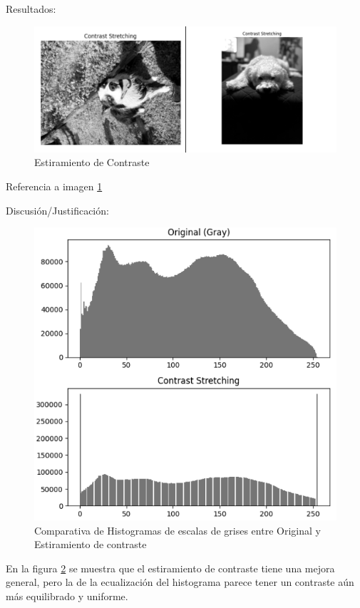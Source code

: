 \documentclass[12pt,letterpaper]{article}
\begin{document}
Resultados:

\begin{figure}[H]
  \centering
  \includegraphics[width=0.8\linewidth]{figuras/estiramiento_de_contraste.png}
  \caption{Estiramiento de Contraste}
  \label{fig:estiramiento_de_contraste}
\end{figure}

Referencia a imagen \ref{fig:estiramiento_de_contraste}

Discusión/Justificación:

\begin{figure}[H]
  \centering
  \includegraphics[width=0.8\linewidth]{figuras/estiramiento_de_contraste_justificacion.png}
  \caption{Comparativa de Histogramas de escalas de grises entre Original y Estiramiento de contraste}
  \label{fig:estiramiento_de_contraste_justificacion}
\end{figure}

En la figura \ref{fig:estiramiento_de_contraste_justificacion} se muestra que el estiramiento de contraste tiene una mejora general, pero la de la ecualización del histograma parece tener un contraste aún más equilibrado y uniforme.
\end{document}
